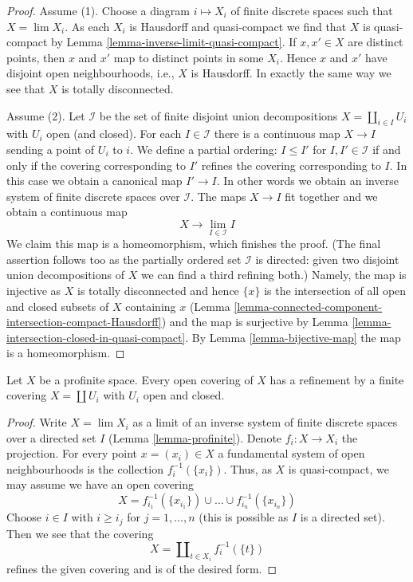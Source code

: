 \begin{proof}
Assume (1). Choose a diagram $i \mapsto X_i$ of finite discrete spaces
such that $X = \lim X_i$. As each $X_i$ is Hausdorff and quasi-compact we find
that $X$ is quasi-compact by Lemma \ref{lemma-inverse-limit-quasi-compact}.
If $x, x' \in X$ are distinct points, then $x$ and $x'$ map to
distinct points in some $X_i$. Hence $x$ and $x'$ have disjoint
open neighbourhoods, i.e., $X$ is Hausdorff. In exactly the same way
we see that $X$ is totally disconnected.

\medskip\noindent
Assume (2). Let $\mathcal{I}$ be the set of finite disjoint union
decompositions $X = \coprod_{i \in I} U_i$ with $U_i$ open (and closed).
For each $I \in \mathcal{I}$ there is a continuous map
$X \to I$ sending a point of $U_i$ to $i$. We define a partial
ordering: $I \leq I'$ for $I, I' \in \mathcal{I}$ if and only
if the covering corresponding to $I'$ refines the covering corresponding
to $I$. In this case we obtain a canonical map $I' \to I$. In other
words we obtain an inverse system of finite discrete spaces over $\mathcal{I}$.
The maps $X \to I$ fit together and we obtain a continuous map
$$
X \longrightarrow \lim_{I \in \mathcal{I}} I
$$
We claim this map is a homeomorphism, which finishes the proof.
(The final assertion follows too as the partially ordered set
$\mathcal{I}$ is directed: given two disjoint union decompositions
of $X$ we can find a third refining both.)
Namely, the map is injective as $X$ is totally disconnected
and hence $\{x\}$ is the intersection of all open and closed subsets
of $X$ containing $x$
(Lemma \ref{lemma-connected-component-intersection-compact-Hausdorff})
and  the map is surjective by
Lemma \ref{lemma-intersection-closed-in-quasi-compact}.
By Lemma \ref{lemma-bijective-map} the map is a homeomorphism.
\end{proof}

\begin{lemma}
\label{lemma-profinite-refine-open-covering}
Let $X$ be a profinite space. Every open covering of $X$ has a refinement
by a finite covering $X = \coprod U_i$ with $U_i$ open and closed.
\end{lemma}

\begin{proof}
Write $X = \lim X_i$ as a limit of an inverse system of finite discrete
spaces over a directed set $I$ (Lemma \ref{lemma-profinite}).
Denote $f_i : X \to X_i$ the projection.
For every point $x = (x_i) \in X$ a fundamental system of open neighbourhoods
is the collection $f_i^{-1}(\{x_i\})$. Thus, as $X$ is quasi-compact, we may
assume we have an open covering
$$
X = f_{i_1}^{-1}(\{x_{i_1}\}) \cup \ldots \cup f_{i_n}^{-1}(\{x_{i_n}\})
$$
Choose $i \in I$ with $i \geq i_j$ for $j = 1, \ldots, n$ (this is possible
as $I$ is a directed set). Then we see
that the covering
$$
X = \coprod\nolimits_{t \in X_i} f_i^{-1}(\{t\})
$$
refines the given covering and is of the desired form.
\end{proof}

